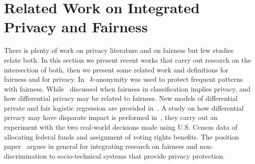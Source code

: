 \documentclass[runningheads]{llncs}
\begin{document}
\section{Related Work on Integrated Privacy and Fairness}
\label{sec:related}
There is plenty of work on privacy literature and on fairness but few studies relate both. In this section we present recent works that carry out research on the intersection of both, then we present some related work and definitions for fairness and for privacy.
In~\cite{Hajian:2015} $k$-anonymity was used to protect frequent patterns with fairness.
While~\cite{Dwork:2012} discussed when fairness in classification implies privacy, and how differential privacy may be related to fairness. New models of differential private and fair logistic regression are provided in~\cite{Xu:2019}. A study on how differential privacy may have disparate impact is performed in~\cite{Pujol:2020}, they carry out an experiment with the two real-world decisions made using U.S. Census data of allocating federal funds and assignment of voting rights benefits. 
The position paper~\cite{Ekstrand:2018} argues in general for integrating research on fairness and non-discrimination to socio-technical systems that provide privacy protection.

\end{document}
